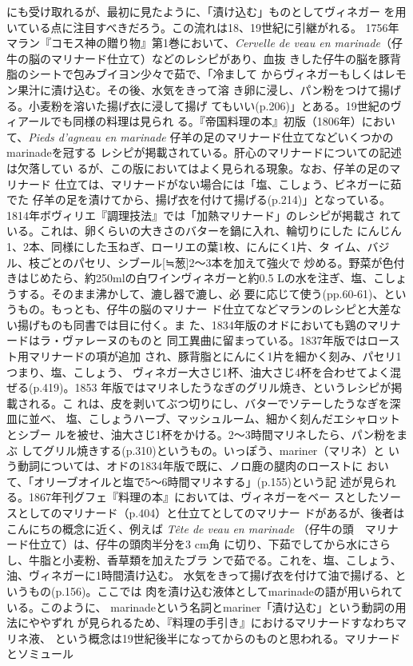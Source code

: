 {{{{  にも受け取れるが、最初に見たように、「漬け込む」ものとしてヴィネガー
  を用いている点に注目すべきだろう。この流れは18、19世紀に引継がれる。
  1756年マラン『コモス神の贈り物』第1巻において、\emph{Cervelle de veau
  en marinade}（仔牛の脳のマリナード仕立て）などのレシピがあり、血抜
  きした仔牛の脳を豚背脂のシートで包みブイヨン少々で茹で、「冷まして
  からヴィネガーもしくはレモン果汁に漬け込む。その後、水気をきって溶
  き卵に浸し、パン粉をつけて揚げる。小麦粉を溶いた揚げ衣に浸して揚げ
  てもいい(p.206)」とある。19世紀のヴィアールでも同様の料理は見られ
  る。『帝国料理の本』初版（1806年）において、\emph{Pieds d'agneau en
  marinade} 仔羊の足のマリナード仕立てなどいくつかのmarinadeを冠する
  レシピが掲載されている。肝心のマリナードについての記述は欠落してい
  るが、この版においてはよく見られる現象。なお、仔羊の足のマリナード
  仕立ては、マリナードがない場合には「塩、こしょう、ビネガーに茹でた
  仔羊の足を漬けてから、揚げ衣を付けて揚げる(p.214)」となっている。
  1814年ボヴィリエ『調理技法』では「加熱マリナード」のレシピが掲載さ
  れている。これは、卵くらいの大きさのバターを鍋に入れ、輪切りにした
  にんじん1、2本、同様にした玉ねぎ、ローリエの葉1枚、にんにく1片、タ
  イム、バジル、枝ごとのパセリ、シブール{[}≒葱{]}2〜3本を加えて強火で
  炒める。野菜が色付きはじめたら、約250mlの白ワインヴィネガーと約0.5
  Lの水を注ぎ、塩、こしょうする。そのまま沸かして、漉し器で漉し、必
  要に応じて使う(pp.60-61)、というもの。もっとも、仔牛の脳のマリナー
  ド仕立てなどマランのレシピと大差ない揚げものも同書では目に付く。ま
  た、1834年版のオドにおいても鶏のマリナードはラ・ヴァレーヌのものと
  同工異曲に留まっている。1837年版ではロースト用マリナードの項が追加
  され、豚背脂とにんにく1片を細かく刻み、パセリ1つまり、塩、こしょう、
  ヴィネガー大さじ1杯、油大さじ4杯を合わせてよく混ぜる(p.419)。1853
  年版ではマリネしたうなぎのグリル焼き、というレシピが掲載される。こ
  れは、皮を剥いてぶつ切りにし、バターでソテーしたうなぎを深皿に並べ、
  塩、こしょうハーブ、マッシュルーム、細かく刻んだエシャロットとシブー
  ルを被せ、油大さじ1杯をかける。2〜3時間マリネしたら、パン粉をまぶ
  してグリル焼きする(p.310)というもの。いっぽう、mariner（マリネ）と
  いう動詞については、オドの1834年版で既に、ノロ鹿の腿肉のローストに
  おいて、「オリーブオイルと塩で5〜6時間マリネする」(p.155)という記
  述が見られる。1867年刊グフェ『料理の本』においては、ヴィネガーをベー
  スとしたソースとしてのマリナード（p.404）と仕立てとしてのマリナー
  ドがあるが、後者はこんにちの概念に近く、例えば \emph{Tête de veau en
  marinade} （仔牛の頭　マリナード仕立て）は、仔牛の頭肉半分を3 cm角
  に切り、下茹でしてから水にさらし、牛脂と小麦粉、香草類を加えたブラ
  ンで茹でる。これを、塩、こしょう、油、ヴィネガーに1時間漬け込む。
  水気をきって揚げ衣を付けて油で揚げる、というもの(p.156)。ここでは
  肉を漬け込む液体としてmarinadeの語が用いられている。このように、
  marinadeという名詞とmariner「漬け込む」という動詞の用法にややずれ
  が見られるため、『料理の手引き』におけるマリナードすなわちマリネ液、
  という概念は19世紀後半になってからのものと思われる。}}{マリナードとソミュール}}\label{ux30deux30eaux30caux30fcux30c9ux3068ux30bdux30dfux30e5ux30fcux30eb1}}

